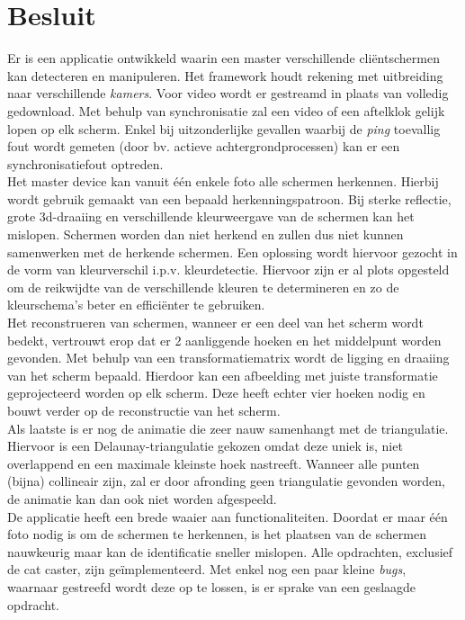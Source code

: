 \section{Besluit}
Er is een applicatie ontwikkeld waarin een master verschillende cliëntschermen kan detecteren en manipuleren. Het framework houdt rekening met uitbreiding naar verschillende {\it kamers}. Voor video wordt er gestreamd in plaats van volledig gedownload. Met behulp van synchronisatie zal een video of een aftelklok gelijk lopen op elk scherm. Enkel bij uitzonderlijke gevallen waarbij de {\it ping} toevallig fout wordt gemeten (door bv. actieve achtergrondprocessen) kan er een synchronisatiefout optreden.\\[3mm]
Het master device kan vanuit één enkele foto alle schermen herkennen. Hierbij wordt gebruik gemaakt van een bepaald herkenningspatroon. Bij sterke reflectie, grote 3d-draaiing en verschillende kleurweergave van de schermen kan het mislopen. Schermen worden dan niet herkend en zullen dus niet kunnen samenwerken met de herkende schermen. Een oplossing wordt hiervoor gezocht in de vorm van kleurverschil i.p.v. kleurdetectie. Hiervoor zijn er al plots opgesteld om de reikwijdte van de verschillende kleuren te determineren en zo de kleurschema's beter en efficiënter te gebruiken.\\[3mm]
Het reconstrueren van schermen, wanneer er een deel van het scherm wordt bedekt, vertrouwt erop dat er 2 aanliggende hoeken en het middelpunt worden gevonden. Met behulp van een transformatiematrix wordt de ligging en draaiing van het scherm bepaald. Hierdoor kan een afbeelding met juiste transformatie geprojecteerd worden op elk scherm. Deze heeft echter vier hoeken nodig en bouwt verder op de reconstructie van het scherm.\\[3mm]
Als laatste is er nog de animatie die zeer nauw samenhangt met de triangulatie. Hiervoor is een Delaunay-triangulatie gekozen omdat deze uniek is, niet overlappend en een maximale kleinste hoek nastreeft. Wanneer alle punten (bijna) collineair zijn, zal er door afronding geen triangulatie gevonden worden, de animatie kan dan ook niet worden afgespeeld.\\[3mm]
De applicatie heeft een brede waaier aan functionaliteiten. Doordat er maar één foto nodig is om de schermen te herkennen, is het plaatsen van de schermen nauwkeurig maar kan de identificatie sneller mislopen. Alle opdrachten, exclusief de cat caster, zijn geïmplementeerd. Met enkel nog een paar kleine {\it bugs}, waarnaar gestreefd wordt deze op te lossen, is er sprake van een geslaagde opdracht.